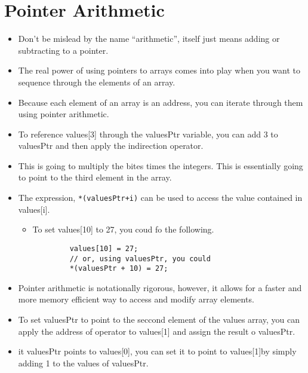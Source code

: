 \section{Pointer Arithmetic}
\begin{itemize}
    \item Don't be mislead by the name ``arithmetic'', itself just means adding or subtracting to a pointer.
    \item The real power of using pointers to arrays comes into play when you want to sequence through the elements of an array.
    \item Because each element of an array is an address, you can iterate through them using pointer arithmetic. 
    \item To reference values[3] through the valuesPtr variable, you can add 3 to valuesPtr and then apply the indirection operator. 
    
    \item This is going to multiply the bites times the integers. This is essentially going to point to the third element in the array. 
    \item The expression, \texttt{*(valuesPtr+i)} can be used to access the value contained in values[i].
        \begin{itemize}
            \item To set values[10] to 27, you coud fo the following. 
        \end{itemize}
        \begin{verbatim}
            values[10] = 27; 
            // or, using valuesPtr, you could
            *(valuesPtr + 10) = 27;
        \end{verbatim}
    
    \item Pointer arithmetic is notationally rigorous, however, it allows for a faster and more memory efficient way to access and modify array elements. 
    \item To set valuesPtr to point to the seccond element of the values array, you can apply the address of operator to values[1] and assign the result o valuesPtr. 
    
    \item it valuesPtr points to values[0], you can set it to point to values[1]by simply adding 1 to the values of valuesPtr. 
    

\end{itemize}
